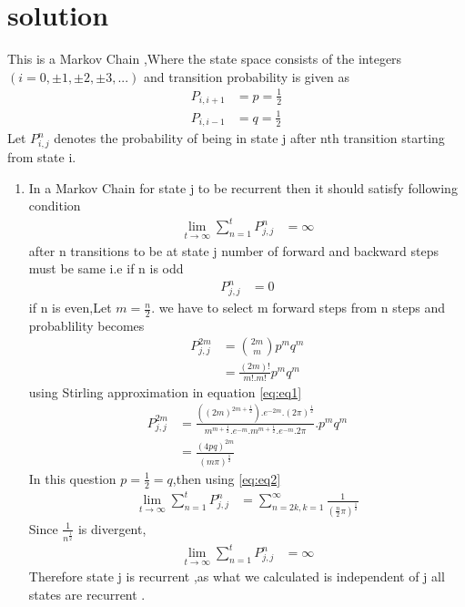 \documentclass[journal,12pt,twocolumn]{IEEEtran}
\begin{document}
\section{solution }
This is a Markov Chain ,Where the state space consists of the integers $(i=0,\pm1,\pm2,\pm3,...)$ and transition  probability is given as
\begin{align}
   P_{i,i+1} &= p =\frac{1}{2}
   \\
   P_{i,i-1} & =q =\frac{1}{2}
\end{align}
Let $P_{i,j}^{n}$ denotes the probability of being in state j after nth transition starting from state i.
\newline
\begin{enumerate}
    \item
In a Markov Chain for state j to be recurrent then it should satisfy following condition
\begin{align}
     \lim_{t\to\infty}\sum_{n=1}^t P_{j,j}^{n}&=\infty
\end{align}
after n transitions to be at state j number of forward and backward steps must be same i.e 
 if n is odd
\begin{align}
    P_{j,j}^{n} &=0 
\end{align}
if n is even,Let $m = \frac{n}{2}$. we have to select m forward steps from  n steps and probablility becomes
\begin{align}
     P_{j,j}^{2m} &=\binom{2m}{m}p^{m}q^{m}
     \\
     &=\frac{(2m)!}{m!.m!}p^{m}q^{m}
     \label{eq:eq1}
\end{align}
using Stirling approximation in equation \eqref{eq:eq1} 
\begin{align}
    P_{j,j}^{2m} &=\frac{((2m)^{2m +\frac{1}{2}}).e^{-2m}.(2\pi)^{\frac{1}{2}}}{m^{m+\frac{1}{2}}.e^{-m}.m^{m+\frac{1}{2}}.e^{-m}.2\pi}.p^{m}q^{m}
    \\
    &=\frac{(4pq)^{2m}}{(m\pi)^{\frac{1}{2}}}
    \label{eq:eq2}
\end{align}
In this question $p =\frac{1}{2}=q$,then using \eqref{eq:eq2} 
\begin{align}
    \lim_{t\to\infty}\sum_{n=1}^t P_{j,j}^{n}&=\sum_{n=2k,k=1}^{\infty}\frac{1}{(\frac{n}{2}\pi)^{\frac{1}{2}}}
\end{align}
Since $\frac{1}{n^{\frac{1}{2}}}$ is divergent,
\begin{align}
     \lim_{t\to\infty}\sum_{n=1}^t P_{j,j}^{n}& = \infty
\end{align}
Therefore state j is recurrent ,as what we calculated is independent of j all states are recurrent .

\end{enumerate}
\end{document}
